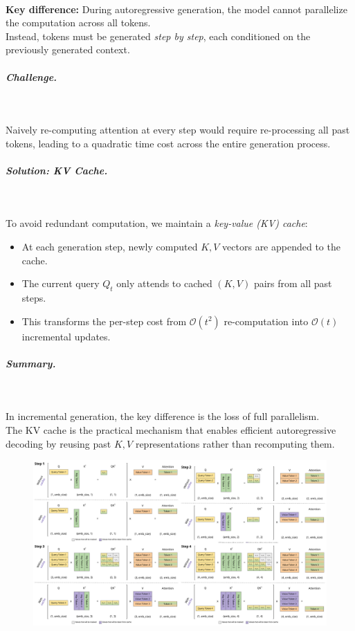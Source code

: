 {
\\
\textbf{Key difference:} During autoregressive generation, the model cannot parallelize the computation across all tokens.\\
Instead, tokens must be generated \emph{step by step}, each conditioned on the previously generated context.

\subparagraph{Challenge.}~{}

Naively re-computing attention at every step would require re-processing all past tokens,
leading to a quadratic time cost across the entire generation process.

\subparagraph{Solution: KV Cache.}~{}

To avoid redundant computation, we maintain a \emph{key-value (KV) cache}:
{\color{tred}
\begin{itemize}
    \item At each generation step, newly computed $K,V$ vectors are appended to the cache.
    \item The current query $Q_t$ only attends to cached $(K,V)$ pairs from all past steps.
    \item This transforms the per-step cost from $\mathcal{O}(t^2)$ re-computation into $\mathcal{O}(t)$ incremental updates.
\end{itemize}
}

\subparagraph{Summary.}~{}

In incremental generation, the key difference is the loss of full parallelism.\\
The KV cache is the practical mechanism that enables efficient autoregressive decoding by
reusing past $K,V$ representations rather than recomputing them.
}


\begin{figure}[htbp]
  \centering
  \includegraphics[width=1\linewidth]{figs/lec3/lec3.33.png}
\end{figure}

